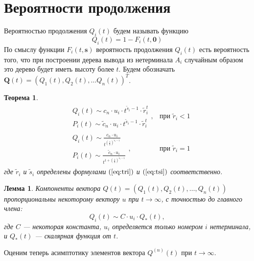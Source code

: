 \documentclass[10pt]{article}
\newtheorem{theorem}{Теорема}
\newtheorem{lemma}{Лемма}
\begin{document}
\section{Вероятности продолжения}

Вероятностью продолжения $Q_i(t)$ будем называть функцию
\begin{equation*}
	Q_i(t) = 1 - F_i(t, \mathbf{0})
\end{equation*}
По смыслу функции $F_i(t, \mathbf{s})$ вероятность продолжения $Q_i(t)$ есть вероятность того, что при построении дерева вывода из нетерминала $A_i$ случайным образом это дерево будет иметь высоту более $t$. Будем обозначать $\mathbf{Q}(t) = (Q_1(t), Q_2(t), \ldots Q_n(t))^T$.

\begin{theorem}
\begin{align*}
    &\begin{array}{l}
        Q_i(t) \sim c_n \cdot u_i \cdot t^{\tilde{s}_i - 1} \cdot \tilde{r}_i^t \\
        P_i(t) \sim \tilde{c}_n \cdot u_i \cdot t^{\tilde{s}_i - 1} \cdot \tilde{r}_i^t
    \end{array}, & \text{при } \tilde{r}_i < 1 \\
    &\begin{array}{l}
        Q_i(t) \sim \frac{c_n \cdot u_i}{t^{\left(\frac{1}{2}\right)^{\tilde{s}_i - 1}}} \\
        P_i(t) \sim \frac{\tilde{c}_n \cdot u_i}{t^{1 + \left(\frac{1}{2}\right)^{\tilde{s}_i - 1}}}
    \end{array}, & \text{при } \tilde{r}_i = 1
\end{align*}
где $\tilde{r}_i$ и $\tilde{s}_i$ определены формулами $(\ref{eq:tri})$ и $(\ref{eq:tsi})$ соответственно.
\end{theorem}

\begin{lemma}
Компоненты вектора $Q(t) = \left( Q_1(t), Q_2(t), \ldots, Q_n(t) \right)$ пропорциональны некоторому вектору $u$ при $t \rightarrow \infty$, с точностью до главного члена:
\begin{equation*}
    Q_i(t) \sim C \cdot u_i \cdot Q_*(t),
\end{equation*}
где $C$ --- некоторая константа, $u_i$ определяется только номером $i$ нетерминала, и $Q_*(t)$ --- скалярная функция от $t$.
\end{lemma}

Оценим теперь асимптотику элементов вектора $Q^{(n)}(t)$ при $t \rightarrow \infty$.
\end{document}
